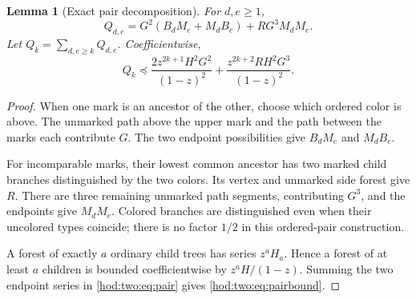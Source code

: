 \documentclass[11pt,letterpaper]{article}
\newtheorem{lemma}[theorem]{Lemma}
\theoremstyle{definition}\newtheorem{definition}[theorem]{Definition}
\theoremstyle{remark}\newtheorem{remark}[theorem]{Remark}
\begin{document}
\begin{lemma}[Exact pair decomposition]\label{hod:two:lem:pair}
For $d,e\ge1$,
\begin{equation}\label{hod:two:eq:pair}
Q_{d,e}=G^2(B_dM_e+M_dB_e)+RG^3M_dM_e.
\end{equation}
Let $Q_k=\sum_{d,e\ge k}Q_{d,e}$. Coefficientwise,
\begin{equation}\label{hod:two:eq:pairbound}
Q_k\preceq
\frac{2z^{2k+1}H^2G^2}{(1-z)^2}
+\frac{z^{2k+2}RH^2G^3}{(1-z)^2}.
\end{equation}
\end{lemma}
\begin{proof}
When one mark is an ancestor of the other, choose which ordered color is above. The unmarked path above the upper mark and the path between the marks each contribute $G$. The two endpoint possibilities give $B_dM_e$ and $M_dB_e$.

For incomparable marks, their lowest common ancestor has two marked child branches distinguished by the two colors. Its vertex and unmarked side forest give $R$. There are three remaining unmarked path segments, contributing $G^3$, and the endpoints give $M_dM_e$. Colored branches are distinguished even when their uncolored types coincide; there is no factor $1/2$ in this ordered-pair construction.

A forest of exactly $a$ ordinary child trees has series $z^aH_a$. Hence a forest of at least $a$ children is bounded coefficientwise by $z^aH/(1-z)$. Summing the two endpoint series in \eqref{hod:two:eq:pair} gives \eqref{hod:two:eq:pairbound}.
\end{proof}
\end{document}
